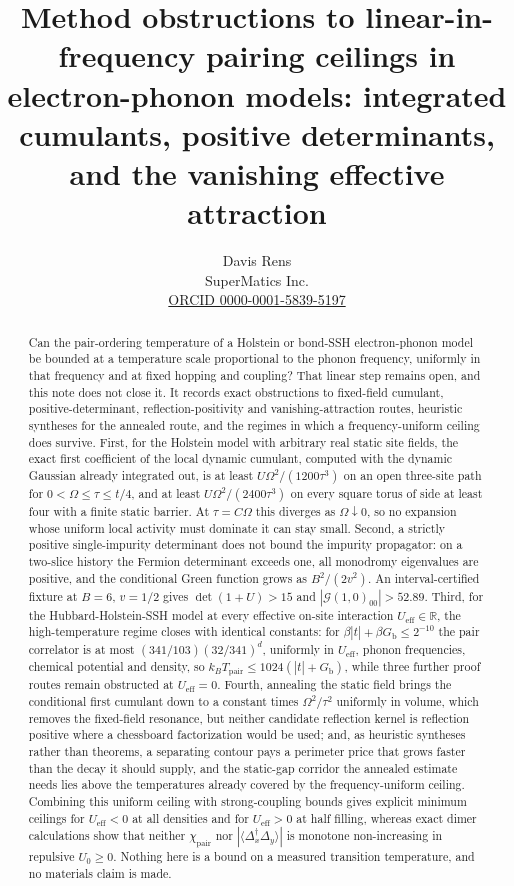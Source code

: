 \documentclass[11pt]{article}
\title{Method obstructions to linear-in-frequency pairing ceilings in
electron-phonon models: integrated cumulants, positive determinants, and the
vanishing effective attraction}
\author{Davis Rens\\SuperMatics Inc.\\\href{https://orcid.org/0000-0001-5839-5197}{ORCID 0000-0001-5839-5197}}
\date{}
\theoremstyle{definition}
\theoremstyle{remark}
\newcommand{\R}{\mathbb{R}}
\newcommand{\eff}{\mathrm{eff}}
\newcommand{\pair}{\mathrm{pair}}
\newcommand{\Ggreen}{\mathcal{G}}
\newcommand{\Tpair}{T_{\pair}}
\newcommand{\Gb}{G_{\mathrm{b}}}
\newcommand{\Ueff}{U_{\eff}}
\begin{document}
\maketitle

\begin{abstract}
Can the pair-ordering temperature of a Holstein or bond-SSH electron-phonon model
be bounded at a temperature scale proportional to the phonon frequency, uniformly
in that frequency and at fixed hopping and coupling? That linear step remains open,
and this note does not close it. It records exact obstructions to fixed-field
cumulant, positive-determinant, reflection-positivity and vanishing-attraction routes,
heuristic syntheses for the annealed route, and the regimes in which a
frequency-uniform ceiling does survive. First, for the Holstein model with
arbitrary real static site fields, the exact first coefficient of the local
dynamic cumulant, computed with the dynamic Gaussian already integrated out,
is at least $U\Omega^2/(1200\tau^3)$ on an open three-site path for
$0<\Omega\le\tau\le t/4$, and at least $U\Omega^2/(2400\tau^3)$ on every square
torus of side at least four with a finite static barrier. At $\tau=C\Omega$ this
diverges as $\Omega\downarrow0$, so no expansion whose uniform local activity must
dominate it can stay small. Second, a strictly positive single-impurity
determinant does not bound the impurity propagator: on a two-slice history the
Fermion determinant exceeds one, all monodromy eigenvalues are positive, and the
conditional Green function grows as $B^2/(2v^2)$. An interval-certified fixture at
$B=6$, $v=1/2$ gives $\det(1+U)>15$ and $|\Ggreen(1,0)_{00}|>52.89$. Third, for
the Hubbard-Holstein-SSH model at every effective on-site interaction
$\Ueff\in\R$, the high-temperature regime closes with identical constants: for
$\beta|t|+\beta\Gb\le2^{-10}$ the pair correlator is at most
$(341/103)(32/341)^{d}$, uniformly in $\Ueff$, phonon frequencies, chemical potential
and density, so $k_B\Tpair\le1024(|t|+\Gb)$, while three further proof routes
remain obstructed at $\Ueff=0$. Fourth, annealing the static field brings the
conditional first cumulant down to a constant times $\Omega^2/\tau^2$ uniformly in
volume, which removes the fixed-field resonance, but neither candidate reflection
kernel is reflection positive where a chessboard factorization would be used; and, as
heuristic syntheses rather than theorems, a separating contour pays a perimeter price
that grows faster than the decay it should supply, and the static-gap corridor the
annealed estimate needs lies above the temperatures already covered by the
frequency-uniform ceiling. Combining this uniform ceiling with strong-coupling
bounds gives explicit minimum ceilings for $\Ueff<0$ at all densities and for
$\Ueff>0$ at half filling, whereas exact dimer calculations show that neither
$\chi_{\pair}$ nor $|\langle\Delta_x^\dagger\Delta_y\rangle|$ is monotone
non-increasing in repulsive $U_0\ge0$. Nothing here is a bound on a measured
transition temperature, and no materials claim is made.
\end{abstract}
\end{document}

